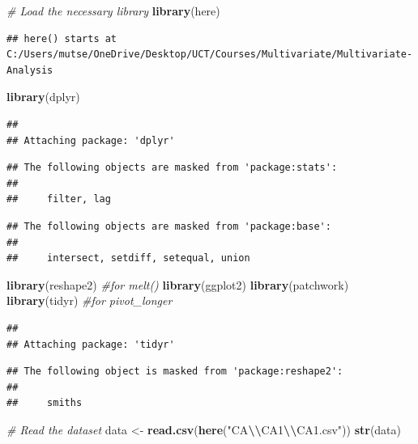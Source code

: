 \documentclass[
]{article}
\author{}
\date{\vspace{-2.5em}}
\newenvironment{Shaded}{\begin{snugshade}}{\end{snugshade}}
\newcommand{\CommentTok}[1]{\textcolor[rgb]{0.56,0.35,0.01}{\textit{#1}}}
\newcommand{\FunctionTok}[1]{\textcolor[rgb]{0.13,0.29,0.53}{\textbf{#1}}}
\newcommand{\NormalTok}[1]{#1}
\newcommand{\OtherTok}[1]{\textcolor[rgb]{0.56,0.35,0.01}{#1}}
\newcommand{\SpecialCharTok}[1]{\textcolor[rgb]{0.81,0.36,0.00}{\textbf{#1}}}
\newcommand{\StringTok}[1]{\textcolor[rgb]{0.31,0.60,0.02}{#1}}
\begin{document}
\begin{Shaded}
\begin{Highlighting}[]
\CommentTok{\# Load the necessary library}
\FunctionTok{library}\NormalTok{(here)}
\end{Highlighting}
\end{Shaded}

\begin{verbatim}
## here() starts at C:/Users/mutse/OneDrive/Desktop/UCT/Courses/Multivariate/Multivariate-Analysis
\end{verbatim}

\begin{Shaded}
\begin{Highlighting}[]
\FunctionTok{library}\NormalTok{(dplyr)}
\end{Highlighting}
\end{Shaded}

\begin{verbatim}
## 
## Attaching package: 'dplyr'
\end{verbatim}

\begin{verbatim}
## The following objects are masked from 'package:stats':
## 
##     filter, lag
\end{verbatim}

\begin{verbatim}
## The following objects are masked from 'package:base':
## 
##     intersect, setdiff, setequal, union
\end{verbatim}

\begin{Shaded}
\begin{Highlighting}[]
\FunctionTok{library}\NormalTok{(reshape2) }\CommentTok{\#for melt()}
\FunctionTok{library}\NormalTok{(ggplot2)}
\FunctionTok{library}\NormalTok{(patchwork)}
\FunctionTok{library}\NormalTok{(tidyr)  }\CommentTok{\#for pivot\_longer}
\end{Highlighting}
\end{Shaded}

\begin{verbatim}
## 
## Attaching package: 'tidyr'
\end{verbatim}

\begin{verbatim}
## The following object is masked from 'package:reshape2':
## 
##     smiths
\end{verbatim}

\begin{Shaded}
\begin{Highlighting}[]
\CommentTok{\# Read the dataset}
\NormalTok{data }\OtherTok{\textless{}{-}} \FunctionTok{read.csv}\NormalTok{(}\FunctionTok{here}\NormalTok{(}\StringTok{"CA}\SpecialCharTok{\textbackslash{}\textbackslash{}}\StringTok{CA1}\SpecialCharTok{\textbackslash{}\textbackslash{}}\StringTok{CA1.csv"}\NormalTok{))}
\FunctionTok{str}\NormalTok{(data)}
\end{Highlighting}
\end{Shaded}
\end{document}
